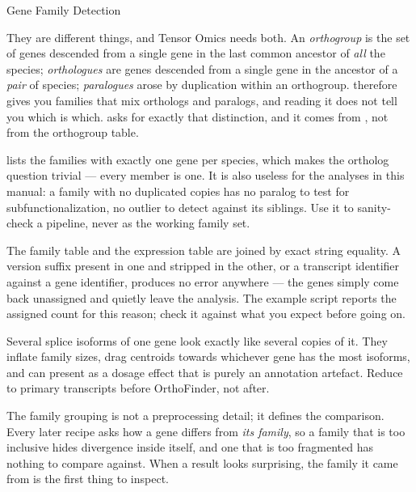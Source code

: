 \begin{recipe}[label=sub:gene-family-detection]{Gene Family Detection}
\begin{pitfall}
  They are different things, and Tensor Omics needs both. An \emph{orthogroup}
  is the set of genes descended from a single gene in the last common ancestor
  of \emph{all} the species; \emph{orthologues} are genes descended from a
  single gene in the ancestor of a \emph{pair} of species; \emph{paralogues}
  arose by duplication within an orthogroup.  therefore
  gives you families that mix orthologs and paralogs, and reading it does not
  tell you which is which.  asks for exactly
  that distinction, and it comes from , not from the
  orthogroup table.
\end{pitfall}

\begin{pitfall}
   lists the families with exactly
  one gene per species, which makes the ortholog question trivial --- every
  member is one. It is also useless for the analyses in this manual: a family
  with no duplicated copies has no paralog to test for subfunctionalization, no
  outlier to detect against its siblings. Use it to sanity-check a pipeline,
  never as the working family set.
\end{pitfall}

\begin{pitfall}
  The family table and the expression table are joined by exact string
  equality. A version suffix present in one and stripped in the other, or a
  transcript identifier against a gene identifier, produces no error anywhere
  --- the genes simply come back unassigned and quietly leave the analysis. The
  example script reports the assigned count for this reason; check it against
  what you expect before going on.
\end{pitfall}

\begin{pitfall}
  Several splice isoforms of one gene look exactly like several copies of it.
  They inflate family sizes, drag centroids towards whichever gene has the most
  isoforms, and can present as a dosage effect that is purely an annotation
  artefact. Reduce to primary transcripts before OrthoFinder, not after.
\end{pitfall}

\begin{interpretation}
  The family grouping is not a preprocessing detail; it defines the comparison.
  Every later recipe asks how a gene differs from \emph{its family}, so a
  family that is too inclusive hides divergence inside itself, and one that is
  too fragmented has nothing to compare against. When a result looks surprising,
  the family it came from is the first thing to inspect.


\end{interpretation}
\end{recipe}
